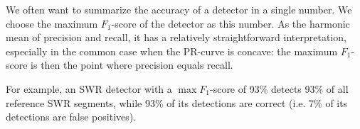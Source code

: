 \label{sec:eval}

We often want to summarize the accuracy of a detector in a single number. We choose the maximum $F_1$-score of the detector as this number. As the harmonic mean of precision and recall, it has a relatively straightforward interpretation, especially in the common case when the PR-curve is concave: the maximum $F_1$-score is then the point where precision equals recall.

For example, an SWR detector with a $\max F_1$-score of 93\% detects 93\% of all reference SWR segments, while 93\% of its detections are correct (i.e. 7\% of its detections are false positives).
